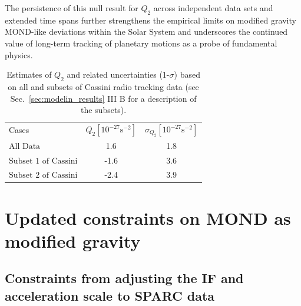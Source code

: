 \documentclass[reprint,nofootinbib,prd,aps]{revtex4-2}
\begin{document}
The persistence of this null result for $Q_2$ across independent data sets and extended time spans further strengthens the empirical limits on modified gravity MOND-like deviations within the Solar System and underscores the continued value of long-term tracking of planetary motions as a probe of fundamental physics.


\begin{table}[htb]
\caption{\label{tab:table1}%
Estimates of $Q_2$ and related uncertainties (1-$\sigma$) based on all and subsets of Cassini radio tracking data (see Sec.~\ref{sec:modelin_results} III B for a description of the subsets).
}
\begin{ruledtabular}
\begin{tabular}{lcc}
\textrm{Cases}&
$Q_{2}[10^{-27}\textrm{s}^{-2}]$&
$\sigma_{Q_{2}}[10^{-27}\textrm{s}^{-2}]$\\
\colrule
$\textrm{All Data}$ & 1.6 & 1.8 \\
$\textrm{Subset 1 of Cassini}$ &  -1.6 & 3.6 \\
$\textrm{Subset 2 of Cassini}$ & -2.4 & 3.9 \\
\end{tabular}
\end{ruledtabular}
\end{table}


\section{Updated constraints on MOND as modified gravity} \label{sec:results}

\subsection{Constraints from adjusting the IF and acceleration scale to SPARC data}\label{sec:SPARC}
\end{document}
